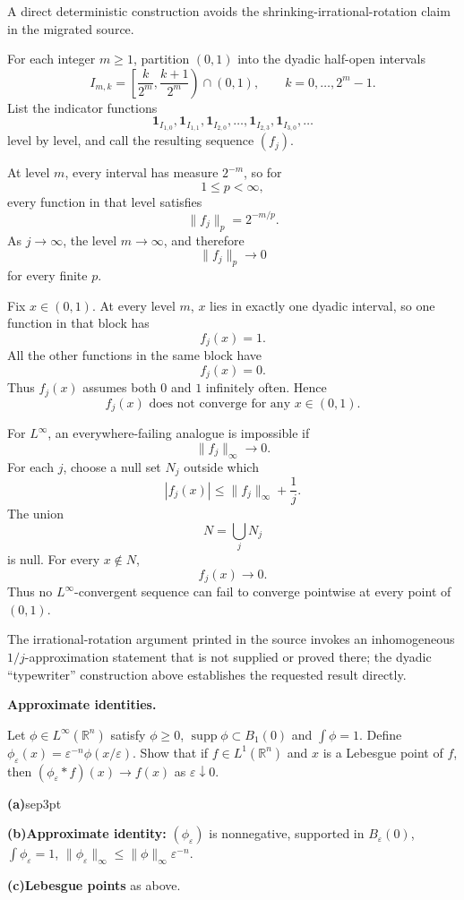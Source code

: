 \begin{solution}
A direct deterministic construction avoids the shrinking-irrational-rotation claim in the
migrated source.

For each integer \(m\ge1\), partition \((0,1)\) into the dyadic half-open intervals
\[
I_{m,k}
=
\left[\frac{k}{2^m},\frac{k+1}{2^m}\right)
\cap(0,1),
\qquad
k=0,\ldots,2^m-1.
\]
List the indicator functions
\[
\mathbf1_{I_{1,0}},\mathbf1_{I_{1,1}},
\mathbf1_{I_{2,0}},\ldots,\mathbf1_{I_{2,3}},
\mathbf1_{I_{3,0}},\ldots
\]
level by level, and call the resulting sequence \((f_j)\).

At level \(m\), every interval has measure \(2^{-m}\), so for
\[
1\le p<\infty,
\]
every function in that level satisfies
\[
\|f_j\|_p
=
2^{-m/p}.
\]
As \(j\to\infty\), the level \(m\to\infty\), and therefore
\[
\boxed{\|f_j\|_p\to0}
\]
for every finite \(p\).

Fix \(x\in(0,1)\). At every level \(m\), \(x\) lies in exactly one dyadic interval, so one
function in that block has
\[
f_j(x)=1.
\]
All the other functions in the same block have
\[
f_j(x)=0.
\]
Thus \(f_j(x)\) assumes both \(0\) and \(1\) infinitely often. Hence
\[
\boxed{
f_j(x)\text{ does not converge for any }x\in(0,1).
}
\]

For \(L^\infty\), an everywhere-failing analogue is impossible if
\[
\|f_j\|_\infty\to0.
\]
For each \(j\), choose a null set \(N_j\) outside which
\[
|f_j(x)|
\le
\|f_j\|_\infty+\frac1j.
\]
The union
\[
N=\bigcup_jN_j
\]
is null. For every \(x\notin N\),
\[
f_j(x)\to0.
\]
Thus no \(L^\infty\)-convergent sequence can fail to converge pointwise at every point of
\((0,1)\).

The irrational-rotation argument printed in the source invokes an inhomogeneous
\(1/j\)-approximation statement that is not supplied or proved there; the dyadic
``typewriter'' construction above establishes the requested result directly.
\end{solution}


\begin{problem}[CP-II-0071]
\label{prob:cp-ii-0071}
\textbf{Approximate identities.}

\hspace*{1.5em}Let $\phi\in L^\infty(\mathbb{R}^n)$ satisfy $\phi\ge0$, $\operatorname{supp}\phi\subset B_1(0)$ and $\int\phi=1$.
Define $\phi_\varepsilon(x)=\varepsilon^{-n}\phi(x/\varepsilon)$. Show that if $f\in L^1(\mathbb{R}^n)$ and $x$ is a
Lebesgue point of $f$, then $(\phi_\varepsilon * f)(x)\to f(x)$ as $\varepsilon\downarrow0$.

 \par\smallskip\noindent\textbf{(a)}\quad sep3pt
	\par\smallskip\noindent\textbf{(b)}\quad \textbf{Approximate identity:} $(\phi_\varepsilon)$ is nonnegative, supported in $B_\varepsilon(0)$,
	$\int\phi_\varepsilon=1$, $\|\phi_\varepsilon\|_\infty\le \|\phi\|_\infty \varepsilon^{-n}$.
	\par\smallskip\noindent\textbf{(c)}\quad \textbf{Lebesgue points} as above.
\end{problem}

